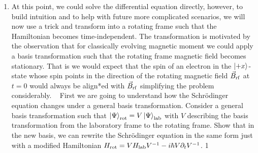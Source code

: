 \documentclass{../lab}
\begin{document}
\begin{enumerate}
\begin{enumerate}
\begin{align*}
	i \frac{\partial}{\partial t} \ket{\psi} =& H \ket{\psi} \\
	i \frac{\partial}{\partial t} 
	\begin{pmatrix}
		a \\
		b
	\end{pmatrix}
	=& 
	\frac{\mu_B}{2}
	\begin{pmatrix}
		B_z & B_1 \cos(\omega_\text{rf} t) - i B_1 \sin(\omega_\text{rf} t) \\
		 B_1 \cos(\omega_\text{rf} t) + i B_1 \sin(\omega_\text{rf} t)& -B_z
	\end{pmatrix}
	\begin{pmatrix}
		a \\
		b
	\end{pmatrix}~.
\end{align*}
	
		\item At this point, we could solve the differential equation directly, however, to build intuition and to help with future more complicated scenarios, we will now use a trick and transform 
			into a rotating frame such that the Hamiltonian becomes time-independent. The transformation is motivated by the 
			observation that for classically evolving magnetic moment we could apply a basis 
			transformation such that the rotating frame
			magnetic field becomes stationary. That is
			we would expect that the spin of an electron in the $\ket{+x}$-state
			whose spin points in the direction of the rotating magnetic
		        field $\vec{B}_{\rm rf}$ at $t=0$ would
			always be align*ed with
			$\vec{B}_{\rm rf}$ simplifying the problem considerably. 
					~\newline
			First we are going to understand how the Schr\"odinger equation changes under a general basis transformation.
			Consider a general basis transformation such that $\ket{\Psi}_{\rm rot} = V\ket{\Psi}_{\rm lab}$ with
			$V$ describing the basis transformation from the laboratory frame to the rotating frame.
			Show that in the new basis, we can rewrite the Schr\"odinger equation in the same form just with a modified
			Hamiltonian $H_{\rm rot}=V H_{\rm lab}V^{-1}-i\hbar V\partial_t V^{-1}$. 
			{1}
			

\end{enumerate}
\end{enumerate}
\end{document}
